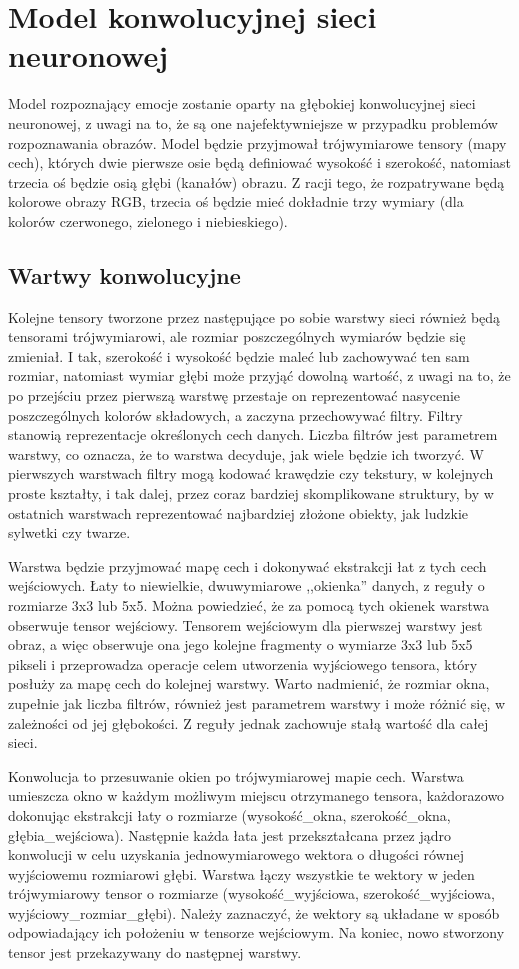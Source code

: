 \section{Model konwolucyjnej sieci neuronowej}
Model rozpoznający emocje zostanie oparty na głębokiej konwolucyjnej sieci neuronowej, z uwagi na to, że są one najefektywniejsze w przypadku problemów rozpoznawania obrazów. Model będzie przyjmował trójwymiarowe tensory (mapy cech), których dwie pierwsze osie będą definiować wysokość i szerokość, natomiast trzecia oś będzie osią głębi (kanałów) obrazu. Z racji tego, że rozpatrywane będą kolorowe obrazy RGB, trzecia oś będzie mieć dokładnie trzy wymiary (dla kolorów czerwonego, zielonego i niebieskiego).

\subsection{Wartwy konwolucyjne}
Kolejne tensory tworzone przez następujące po sobie warstwy sieci również będą tensorami trójwymiarowi, ale rozmiar poszczególnych wymiarów będzie się zmieniał. I tak, szerokość i wysokość będzie maleć lub zachowywać ten sam rozmiar, natomiast wymiar głębi może przyjąć dowolną wartość, z uwagi na to, że po przejściu przez pierwszą warstwę przestaje on reprezentować nasycenie poszczególnych kolorów składowych, a zaczyna przechowywać filtry. Filtry stanowią reprezentacje określonych cech danych. Liczba filtrów jest parametrem warstwy, co oznacza, że to warstwa decyduje, jak wiele będzie ich tworzyć. W pierwszych warstwach filtry mogą kodować krawędzie czy tekstury, w kolejnych proste kształty, i tak dalej, przez coraz bardziej skomplikowane struktury, by w ostatnich warstwach reprezentować najbardziej złożone obiekty, jak ludzkie sylwetki czy twarze.

Warstwa będzie przyjmować mapę cech i dokonywać ekstrakcji łat z tych cech wejściowych. Łaty to niewielkie, dwuwymiarowe ,,okienka'' danych, z reguły o rozmiarze 3x3 lub 5x5. Można powiedzieć, że za pomocą tych okienek warstwa obserwuje tensor wejściowy. Tensorem wejściowym dla pierwszej warstwy jest obraz, a więc obserwuje ona jego kolejne fragmenty o wymiarze 3x3 lub 5x5 pikseli i przeprowadza operacje celem utworzenia wyjściowego tensora, który posłuży za mapę cech do kolejnej warstwy. Warto nadmienić, że rozmiar okna, zupełnie jak liczba filtrów, również jest parametrem warstwy i może różnić się, w zależności od jej głębokości. Z reguły jednak zachowuje stałą wartość dla całej sieci.

Konwolucja to przesuwanie okien po trójwymiarowej mapie cech. Warstwa umieszcza okno w każdym możliwym miejscu otrzymanego tensora, każdorazowo dokonując ekstrakcji łaty o rozmiarze (wysokość\_okna, szerokość\_okna, głębia\_wejściowa). Następnie każda łata jest przekształcana przez jądro konwolucji w celu uzyskania jednowymiarowego wektora o długości równej wyjściowemu rozmiarowi głębi. Warstwa łączy wszystkie te wektory w jeden trójwymiarowy tensor o rozmiarze (wysokość\_wyjściowa, szerokość\_wyjściowa, wyjściowy\_rozmiar\_głębi). Należy zaznaczyć, że wektory są układane w sposób odpowiadający ich położeniu w tensorze wejściowym. Na koniec, nowo stworzony tensor jest przekazywany do następnej warstwy.

